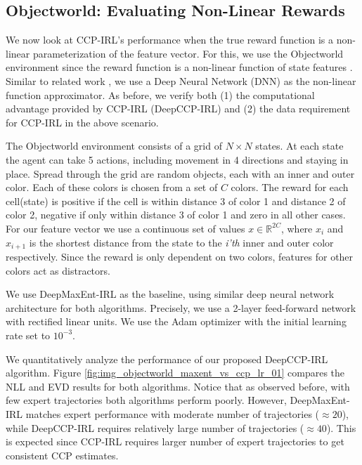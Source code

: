 \documentclass{article}
\begin{document}
\subsection{Objectworld: Evaluating Non-Linear Rewards}

We now look at CCP-IRL's performance when the true reward function is a non-linear parameterization of the feature vector.
For this, we use the Objectworld \cite{levine2011nonlinear} environment since the reward function is a non-linear function of state features \cite{levine2011nonlinear}.
Similar to related work \cite{wulfmeier2015maximum}, we use a Deep Neural Network (DNN) as the non-linear function approximator.
As before, we verify both (1) the computational advantage provided by CCP-IRL (DeepCCP-IRL) and (2) the data requirement for CCP-IRL in the above scenario.

The Objectworld environment consists of a grid of $N \times N$ states. At each state the agent can take 5 actions, including movement in 4 directions and staying in place. Spread through the grid are random objects, each with an inner and outer color. Each of these colors is chosen from a set of $C$ colors. The reward for each cell(state) is positive if the cell is within distance 3 of color 1 and distance 2 of color 2, negative if only within distance 3 of color 1 and zero in all other cases. For our feature vector we use a continuous set of values $x \in \mathbb{R}^{2C}$, where $x_i$ and $x_{i+1}$ is the shortest distance from the state to the \emph{i'th} inner and outer color respectively. Since the reward is only dependent on two colors, features for other colors act as distractors. 

We use DeepMaxEnt-IRL \cite{wulfmeier2015maximum} as the baseline, using similar deep neural network architecture for both algorithms. Precisely, we use a 2-layer feed-forward network with rectified linear units. We use the Adam \cite{kingma2014adam} optimizer with the initial learning rate set to $10^{-3}$.

We quantitatively analyze the performance of our proposed DeepCCP-IRL algorithm. 
Figure \ref{fig:img_objectworld_maxent_vs_ccp_lr_01} compares the NLL and EVD results for both algorithms. Notice that as observed before, with few expert trajectories both algorithms perform poorly. However, DeepMaxEnt-IRL matches expert performance with moderate number of trajectories ($\approx 20$), while DeepCCP-IRL requires relatively large number of trajectories ($\approx 40$).
This is expected since CCP-IRL requires larger number of expert trajectories to get consistent CCP estimates.
\end{document}
